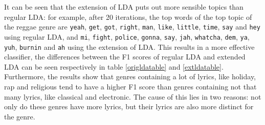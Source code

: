 It can be seen that the extension of LDA puts out more sensible topics than regular LDA: for example, after 20 iterations, the top words of the top topic of the reggae genre are \verb|yeah|, \verb|get|, \verb|got|, \verb|right|, \verb|man|, \verb|like|, \verb|little|, \verb|time|, \verb|say| and \verb|hey| using regular LDA, and \verb|mi|, \verb|fight|, \verb|police|, \verb|gonna|, \verb|say|, \verb|jah|, \verb|whatcha|, \verb|dem|, \verb|ya|, \verb|yuh|, \verb|burnin| and \verb|ah| using the extension of LDA. This results in a more effective classifier, the differences between the F1 scores of regular LDA and extended LDA can be seen respectively in table \ref{origldatable} and \ref{extldatable}. \\
Furthermore, the results show that genres containing a lot of lyrics, like holiday, rap and religious tend to have a higher F1 score than genres containing not that many lyrics, like classical and electronic. The cause of this lies in two reasons: not only do these genres have more lyrics, but their lyrics are also more distinct for the genre. 

